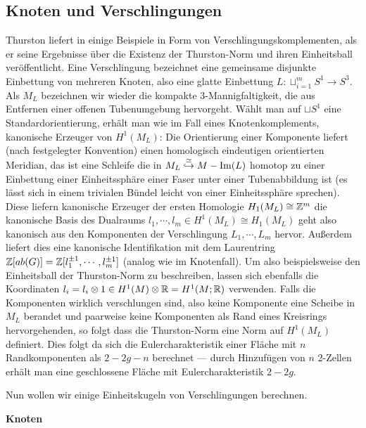     \subsection{Knoten und Verschlingungen}
    \label{sec:links}
    \begin{bsp}[Verschlingungen]
    \label{ex:links}
        Thurston liefert in \cite{Thurston.1986} einige Beispiele in Form von Verschlingungskomplementen, als er seine Ergebnisse über die Existenz der Thurston-Norm und ihren Einheitsball veröffentlicht. Eine Verschlingung bezeichnet eine gemeinsame disjunkte Einbettung von mehreren Knoten, also eine glatte Einbettung $L: \sqcup_{i=1}^m S^1 \to S^3$. Als $M_L$ bezeichnen wir wieder die kompakte 3-Mannigfaltigkeit, die aus Entfernen einer offenen Tubenumgebung hervorgeht. Wählt man auf $\sqcup S^1$ eine Standardorientierung, erhält man wie im Fall eines Knotenkomplements, kanonische Erzeuger von $H^1(M_L)$: Die Orientierung einer Komponente liefert (nach festgelegter Konvention) einen homologisch eindeutigen orientierten Meridian, das ist eine Schleife die in $M_L\stackrel \simeq {\hookrightarrow} M - \operatorname{Im}(L)$ homotop zu einer Einbettung einer Einheitssphäre einer Faser unter einer Tubenabbildung ist (es lässt sich in einem trivialen Bündel leicht von einer Einheitssphäre sprechen). Diese liefern kanonische Erzeuger der ersten Homologie $H_1(M_L) \cong \mathbb{Z}^m$ die kanonische Basis des Dualraums $l_1,\cdots,l_m \in H^1(M_L)\cong H_1(M_L)$ geht also kanonisch aus den Komponenten der Verschlingung $L_1,\cdots,L_m$ hervor. Außerdem liefert dies eine kanonische Identifikation mit dem Laurentring $\mathbb{Z}[ab(G)]=\mathbb{Z}[l_1^{\pm 1},\cdots,l_m^{\pm 1}]$ (analog wie im Knotenfall). Um also beispielsweise den Einheitsball der Thurston-Norm zu beschreiben, lassen sich ebenfalls die Koordinaten $l_i=l_i \otimes 1 \in H^1(M)\otimes \mathbb{R} = H^1(M;\mathbb{R})$ verwenden. Falls die Komponenten wirklich verschlungen sind, also keine Komponente eine Scheibe in $M_L$ berandet und paarweise keine Komponenten als Rand eines Kreisrings hervorgehenden, so folgt dass die Thurston-Norm eine Norm auf $H^1(M_L)$ definiert. Dies folgt da sich die Eulercharakteristik einer Fläche mit $n$ Randkomponenten als $2-2g-n$ berechnet --- durch Hinzufügen von $n$ 2-Zellen erhält man eine geschlossene Fläche mit Eulercharakteristik $2-2g$.
    \end{bsp}
        Nun wollen wir einige Einheitskugeln von Verschlingungen berechnen.
        
        \textbf{Knoten}

